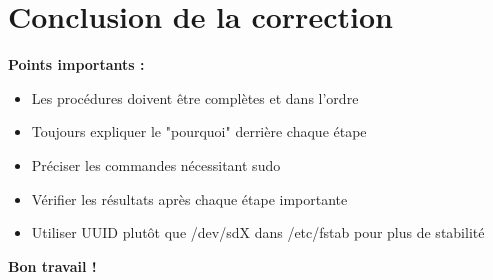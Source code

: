 \documentclass[12pt,a4paper]{article}
\begin{document}
\newpage

\section*{Conclusion de la correction}

\textbf{Points importants :}
\begin{itemize}
    \item Les procédures doivent être complètes et dans l'ordre
    \item Toujours expliquer le "pourquoi" derrière chaque étape
    \item Préciser les commandes nécessitant sudo
    \item Vérifier les résultats après chaque étape importante
    \item Utiliser UUID plutôt que /dev/sdX dans /etc/fstab pour plus de stabilité
\end{itemize}

\textbf{Bon travail !}
\end{document}

